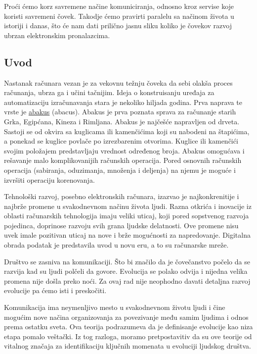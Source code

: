 \documentclass[10pt]{article}
\begin{document}
	Proći ćemo korz savremene načine komuniciranja, odnosno kroz servise koje koristi savremeni čovek. Takodje ćemo pravirti paralelu sa načinom života u istoriji i danas, što će nam dati prilično jasnu sliku koliko je čovekov razvoj ubrzan elektronskim pronalazcima.
	
	
	\subsection{Uvod}
	
	Nastanak računara vezan je za vekovnu težnju čoveka da sebi olakša proces računanja, ubrza ga i učini tačnijim. Ideja o konstruisanju uređaja za automatizaciju izračunavanja stara je nekoliko hiljada godina. Prva naprava te vrste je \href{https://sr.m.wikipedia.org/wiki/%D0%90%D0%B1%D0%B0%D0%BA%D1%83%D1%81_(%D1%80%D0%B0%D1%87%D1%83%D0%BD%D0%B0%D1%9A%D0%B5)}{abakus} (abacus). 
	Abakus je prva poznata sprava za računanje starih Grka, Egipćana, Kineza i Rimljana. Abakus je najčešće napravljen od drveta. Sastoji se od okvira sa kuglicama ili kamenčićima koji su nabodeni na štapićima, a ponekad se kuglice povlače po izrezbarenim otvorima. Kuglice ili kamenčići svojim položajem predstavljaju vrednost određenog broja. Abakus omogućava i rešavanje malo komplikovanijih računskih operacija. Pored osnovnih računskih operacija (sabiranja, oduzimanja, množenja i deljenja) na njemu je moguće i izvršiti operaciju korenovanja.
	
	Tehnološki razvoj, posebno elektronskih računara, izazvao je najkonkrenitije i najbrže promene u svakodnevnom načinu života ljudi. Razna otkrića i inovacije iz oblasti računarskih tehnologija imaju veliki uticaj, koji pored sopstvenog razvoja pojedinca, doprinose razvoju svih grana ljudske delatnosti. Ove promene nisu uvek imale pozitivan uticaj na nove i brže mogućnosti za napredovanje. Digitalna obrada podatak je predstavila uvod u novu eru, a to su računarske mreže.
	
	Društvo se zasniva na komunikaciji. Što bi značilo da je čovečanstvo počelo da se razvija kad su ljudi polčeli da govore. Evolucija se polako odvija i nijedna velika promena nije došla preko noći. Za ovaj rad nije neophodno davati detaljna razvoj evolucije pa ćemo isti i preskočiti. 
	
	Komunikacija ima neymenljivo mesto u svakodnevnom životu ljudi i čine mogućim nove načina organizovanja za povezivanje među samim ljudima i odnos prema ostatku sveta. Ova teorija podrazumeva da je definisanje evolucije kao niza etapa pomalo veštački. Iz tog razloga, moramo pretpostavitiv da su ove teorije od vitalnog značaja za identifikaciju ključnih momenata u evoluciji ljudskog društva.
	
\end{document}
